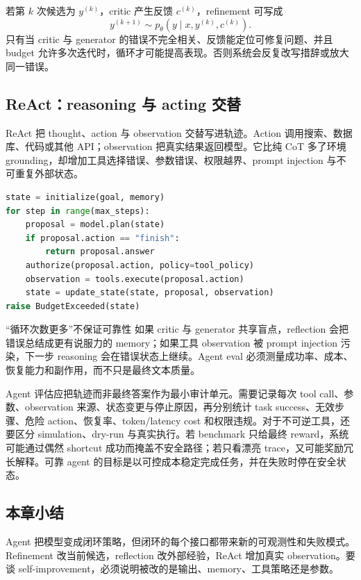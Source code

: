 

若第 $k$ 次候选为 $y^{(k)}$，critic 产生反馈 $c^{(k)}$，refinement 可写成
\[
y^{(k+1)}\sim p_{\theta}(y\mid x,y^{(k)},c^{(k)}).
\]
只有当 critic 与 generator 的错误不完全相关、反馈能定位可修复问题、并且 budget 允许多次迭代时，循环才可能提高表现。否则系统会反复改写措辞或放大同一错误。

\subsection{ReAct：reasoning 与 acting 交替}

ReAct 把 thought、action 与 observation 交替写进轨迹。Action 调用搜索、数据库、代码或其他 API；observation 把真实结果返回模型。它比纯 CoT 多了环境 grounding，却增加工具选择错误、参数错误、权限越界、prompt injection 与不可重复外部状态。


\begin{lstlisting}[language=Python,caption={带权限与终止条件的最小 agent loop}]
state = initialize(goal, memory)
for step in range(max_steps):
    proposal = model.plan(state)
    if proposal.action == "finish":
        return proposal.answer
    authorize(proposal.action, policy=tool_policy)
    observation = tools.execute(proposal.action)
    state = update_state(state, proposal, observation)
raise BudgetExceeded(state)
\end{lstlisting}


\begin{warningbox}{“循环次数更多”不保证可靠性}
如果 critic 与 generator 共享盲点，reflection 会把错误总结成更有说服力的 memory；如果工具 observation 被 prompt injection 污染，下一步 reasoning 会在错误状态上继续。Agent eval 必须测量成功率、成本、恢复能力和副作用，而不只是最终文本质量。
\end{warningbox}

Agent 评估应把轨迹而非最终答案作为最小审计单元。需要记录每次 tool call、参数、observation 来源、状态变更与停止原因，再分别统计 task success、无效步骤、危险 action、恢复率、token/latency cost 和权限违规。对于不可逆工具，还要区分 simulation、dry-run 与真实执行。若 benchmark 只给最终 reward，系统可能通过偶然 shortcut 成功而掩盖不安全路径；若只看漂亮 trace，又可能奖励冗长解释。可靠 agent 的目标是以可控成本稳定完成任务，并在失败时停在安全状态。

\subsection{本章小结}

Agent 把模型变成闭环策略，但闭环的每个接口都带来新的可观测性和失败模式。Refinement 改当前候选，reflection 改外部经验，ReAct 增加真实 observation。要谈 self-improvement，必须说明被改的是输出、memory、工具策略还是参数。

